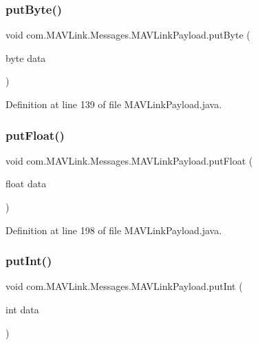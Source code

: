 \subsubsection{\texorpdfstring{putByte()}{putByte()}}
{\footnotesize\ttfamily void com.\+M\+A\+V\+Link.\+Messages.\+M\+A\+V\+Link\+Payload.\+put\+Byte (\begin{DoxyParamCaption}\item[{byte}]{data }\end{DoxyParamCaption})\hspace{0.3cm}{\ttfamily [inline]}}



Definition at line 139 of file M\+A\+V\+Link\+Payload.\+java.

\mbox{\label{classcom_1_1MAVLink_1_1Messages_1_1MAVLinkPayload_ad44953d458ccc2391dd7e0542c83b7a9}} 
\subsubsection{\texorpdfstring{putFloat()}{putFloat()}}
{\footnotesize\ttfamily void com.\+M\+A\+V\+Link.\+Messages.\+M\+A\+V\+Link\+Payload.\+put\+Float (\begin{DoxyParamCaption}\item[{float}]{data }\end{DoxyParamCaption})\hspace{0.3cm}{\ttfamily [inline]}}



Definition at line 198 of file M\+A\+V\+Link\+Payload.\+java.

\mbox{\label{classcom_1_1MAVLink_1_1Messages_1_1MAVLinkPayload_a2edb3b55e2ee92271328db1ffbca0509}} 
\subsubsection{\texorpdfstring{putInt()}{putInt()}}
{\footnotesize\ttfamily void com.\+M\+A\+V\+Link.\+Messages.\+M\+A\+V\+Link\+Payload.\+put\+Int (\begin{DoxyParamCaption}\item[{int}]{data }\end{DoxyParamCaption})\hspace{0.3cm}{\ttfamily [inline]}}




